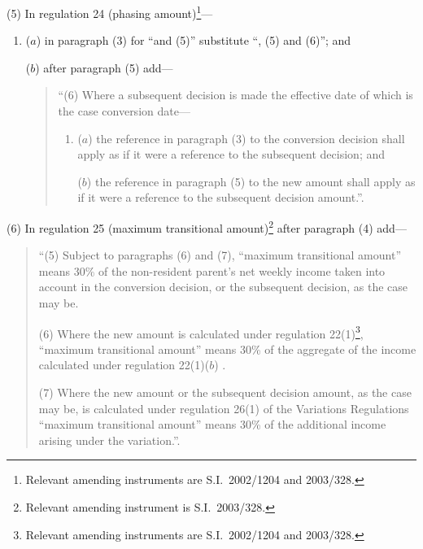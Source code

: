 \documentclass[12pt,a4paper]{article}
\begin{document}
(5) In regulation 24 (phasing amount)\footnote{Relevant amending instruments are S.I.\ 2002/1204 and 2003/328.}—
\begin{enumerate}\item[]
($a$) in paragraph (3) for “and (5)” substitute “, (5) and (6)”; and

($b$) after paragraph (5) add—
\begin{quotation}
“(6) Where a subsequent decision is made the effective date of which is the case conversion date—
\begin{enumerate}\item[]
($a$) the reference in paragraph (3) to the conversion decision shall apply as if it were a reference to the subsequent decision; and

($b$) the reference in paragraph (5) to the new amount shall apply as if it were a reference to the subsequent decision amount.”.
\end{enumerate}
\end{quotation}
\end{enumerate}

(6) In regulation 25 (maximum transitional amount)\footnote{Relevant amending instrument is S.I.\ 2003/328.} after paragraph (4) add—
\begin{quotation}
“(5) Subject to paragraphs (6) and (7), “maximum transitional amount” means 30\% of the non-resident parent’s net weekly income taken into account in the conversion decision, or the subsequent decision, as the case may be.

(6) Where the new amount is calculated under regulation 22(1)\footnote{Relevant amending instruments are S.I.\ 2002/1204 and 2003/328.}, “maximum transitional amount” means 30\% of the aggregate of the income calculated under regulation 22(1)($b$) .

(7) Where the new amount or the subsequent decision amount, as the case may be, is calculated under regulation 26(1) of the Variations Regulations “maximum transitional amount” means 30\% of the additional income arising under the variation.”.
\end{quotation}
\end{document}
